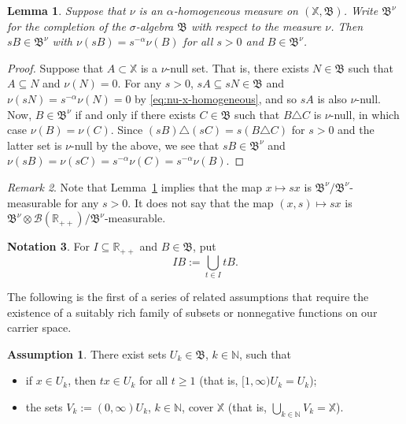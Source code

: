 \documentclass[12pt]{amsart}
\numberwithin{equation}{section}
\numberwithin{figure}{section}
\theoremstyle{plain} \newtheorem{theorem}{Theorem}[section]
\theoremstyle{plain} \newtheorem{proposition}[theorem]{Proposition}
\theoremstyle{plain} \newtheorem{lemma}[theorem]{Lemma}
\theoremstyle{plain} \newtheorem{corollary}[theorem]{Corollary}
\theoremstyle{definition} \newtheorem{definition}[theorem]{Definition}
\theoremstyle{definition} \newtheorem{notation}[theorem]{Notation}
\theoremstyle{remark} \newtheorem{remark}[theorem]{Remark}
\theoremstyle{remark} \newtheorem{example}[theorem]{Example}
\theoremstyle{definition} \newtheorem{assumption}{Assumption}
\newcommand{\bN}{\mathbb{N}}
\newcommand{\bR}{\mathbb{R}}
\newcommand{\bX}{\mathbb{X}}
\newcommand{\cB}{\mathcal{B}}
\newcommand{\salg}{\mathfrak{B}}
\begin{document}
\begin{lemma}
  \label{lemma:extend_homo_completion}
  Suppose that $\nu$ is an $\alpha$-homogeneous measure on $(\bX,
  \salg)$.  Write $\salg^\nu$ for the completion of the
  $\sigma$-algebra $\salg$ with respect to the measure $\nu$.  Then $s
  B \in \salg^\nu$ with $\nu(sB)=s^{-\alpha}\nu(B)$ for all $s > 0$
  and $B \in \salg^\nu$.
\end{lemma}
\begin{proof}
  Suppose that $A \subset \bX$ is a $\nu$-null set.  That is, there
  exists $N \in \salg$ such that $A \subseteq N$ and $\nu(N) = 0$.
  For any $s > 0$, $s A \subseteq s N \in \salg$ and $\nu(s N) =
  s^{-\alpha}\nu(N) = 0$ by \eqref{eq:nu-x-homogeneous}, and so $s A$
  is also $\nu$-null.  Now, $B \in \salg^\nu$ if and only if there
  exists $C \in \salg$ such that $B \triangle C$ is $\nu$-null, in
  which case $\nu(B) = \nu(C)$.  Since $(s B) \triangle (s C) = s (B
  \triangle C)$ for $s > 0$ and the latter set is $\nu$-null by the
  above, we see that $s B \in \salg^\nu$ and $\nu(s B)= \nu(s C) =
  s^{-\alpha}\nu(C) = s^{-\alpha}\nu(B)$.
\end{proof}

\begin{remark}
  Note that Lemma~\ref{lemma:extend_homo_completion} implies that the
  map $x \mapsto s x$ is $\salg^\nu / \salg^\nu$-measurable for any
  $s>0$.  It does not say that the map $(x, s) \mapsto s x$ is
  $\salg^\nu \otimes \cB(\bR_{++}) / \salg^\nu$-measurable.
\end{remark}

\begin{notation}
  For $I\subseteq\bR_{++}$ and $B \in \salg$, put
  \begin{displaymath}
    IB:=\bigcup_{t\in I} tB. 
  \end{displaymath}
\end{notation}

The following is the first of a series of related assumptions that
require the existence of a suitably rich family of subsets or 
nonnegative functions on our carrier space.

\begin{assumption}
  \label{assumption:U}
  There exist sets $U_k\in\salg$, $k\in\bN$, such that
  \begin{itemize}
  \item[(i)] if $x\in U_k$, then $tx\in U_k$ for all $t\geq1$ 
  (that is, $[1,\infty) U_k = U_k$);
  \item[(ii)] the sets $V_k:=(0,\infty) U_k$, $k\in\bN$, cover $\bX$
  (that is, $\bigcup_{k \in \bN} V_k = \bX$). 
  \end{itemize}
\end{assumption}
\end{document}
